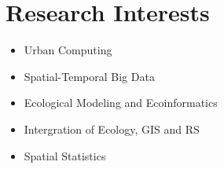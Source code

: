 \section*{Research Interests}

\begin{itemize}
\item Urban Computing
\item Spatial-Temporal Big Data
\item Ecological Modeling and Ecoinformatics
\item Intergration of Ecology, GIS and RS
\item Spatial Statistics
\end{itemize}
